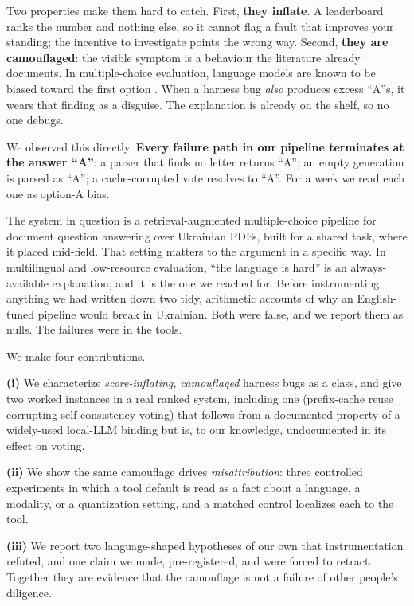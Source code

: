\documentclass{article}
\begin{document}
Two properties make them hard to catch. First, \textbf{they inflate}. A leaderboard ranks the number and nothing else, so it cannot flag a fault that improves your standing; the incentive to investigate points the wrong way. Second, \textbf{they are camouflaged}: the visible symptom is a behaviour the literature already documents. In multiple-choice evaluation, language models are known to be biased toward the first option \cite{zheng2024selectors}. When a harness bug \emph{also} produces excess ``A''s, it wears that finding as a disguise. The explanation is already on the shelf, so no one debugs.

We observed this directly. \textbf{Every failure path in our pipeline terminates at the answer ``A''}: a parser that finds no letter returns ``A''; an empty generation is parsed as ``A''; a cache-corrupted vote resolves to ``A''. For a week we read each one as option-A bias.

The system in question is a retrieval-augmented multiple-choice pipeline for document question answering over Ukrainian PDFs, built for a shared task, where it placed mid-field. That setting matters to the argument in a specific way. In multilingual and low-resource evaluation, ``the language is hard'' is an always-available explanation, and it is the one we reached for. Before instrumenting anything we had written down two tidy, arithmetic accounts of why an English-tuned pipeline would break in Ukrainian. Both were false, and we report them as nulls. The failures were in the tools.

We make four contributions.

\textbf{(i)} We characterize \emph{score-inflating, camouflaged} harness bugs as a class, and give two worked instances in a real ranked system, including one (prefix-cache reuse corrupting self-consistency voting) that follows from a documented property of a widely-used local-LLM binding but is, to our knowledge, undocumented in its effect on voting.

\textbf{(ii)} We show the same camouflage drives \emph{misattribution}: three controlled experiments in which a tool default is read as a fact about a language, a modality, or a quantization setting, and a matched control localizes each to the tool.

\textbf{(iii)} We report two language-shaped hypotheses of our own that instrumentation refuted, and one claim we made, pre-registered, and were forced to retract. Together they are evidence that the camouflage is not a failure of other people's diligence.
\end{document}
